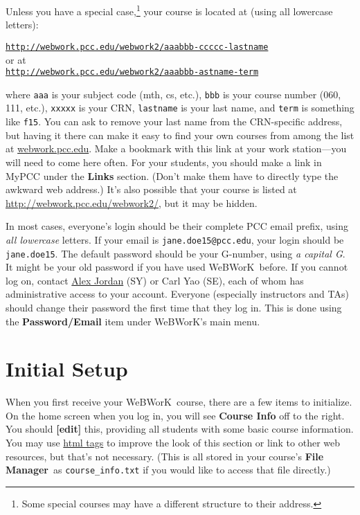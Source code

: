 \documentclass[12pt]{article}
\newcommand{\menu}[1]{\textbf{#1}}
\newcommand{\WW}{WeBWorK}
\newcommand{\FM}{\menu{File Manager}}
\begin{document}
Unless you have a special case,\footnote{Some special courses may have a different structure to their address.} your course is located at (using all lowercase letters):
\begin{center}
\href{http://webwork.pcc.edu/webwork2/}{\texttt{http://webwork.pcc.edu/webwork2/aaabbb-ccccc-lastname}}\\
or at\\
 \href{http://webwork.pcc.edu/webwork2/}{\texttt{http://webwork.pcc.edu/webwork2/aaabbb-astname-term}} 
\end{center} where \texttt{aaa} is your subject code (mth, cs, etc.), \texttt{bbb} is your course number (060, 111, etc.),  \texttt{xxxxx} is your CRN, \texttt{lastname} is your last name, and \texttt{term} is something like \texttt{f15}. You can ask to remove your last name from the CRN-specific address, but having it there can make it easy to find your own courses from among the list at \url{webwork.pcc.edu}. Make a bookmark with this link at your work station---you will need to come here often. For your students, you should make a link in MyPCC under the \menu{Links} section. (Don't make them have to directly type the awkward web address.) It's also possible that your course is listed at \href{http://webwork.pcc.edu/webwork2/}{http://webwork.pcc.edu/webwork2/}, but it may be hidden.

In most cases, everyone's login should be their complete PCC email prefix, using \emph{all lowercase} letters.  If your email is \texttt{jane.doe15@pcc.edu}, your login should be \texttt{jane.doe15}.  The default password should be your G-number, using \emph{a capital G}.  It might be your old password if you have used \WW\ before.  If you cannot log on, contact \href{mailto:alex.jordan@pcc.edu}{Alex Jordan} (SY) or Carl Yao (SE), each of whom has administrative access to your account.  Everyone (especially instructors and TAs) should change their password the first time that they log in.  This is done using the \menu{Password/Email} item under \WW's main menu.


\section{Initial Setup}
When you first receive your \WW\ course, there are a few items to initialize.  On the home screen when you log in, you will see \menu{Course Info} off to the right.  You should \menu{[edit]} this, providing all students with some basic course information.  You may use \href{http://en.wikipedia.org/wiki/HTML_element}{html tags} to improve the look of this section or link to other web resources, but that's not necessary.  (This is all stored in your course's \FM\  as \verb=course_info.txt= if you would like to access that file directly.) 
\end{document}
